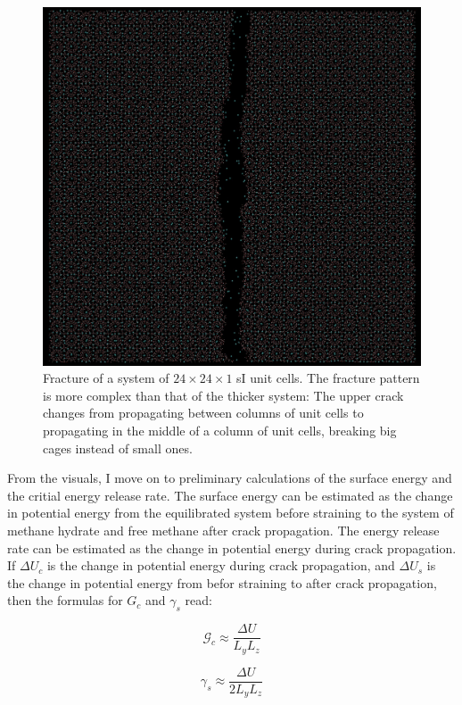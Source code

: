 \begin{figure}
\includegraphics[width=\textwidth]{../pictures/slim_system.pdf}
\caption{Fracture of a system of $24 \times 24 \times 1$ sI unit cells. The fracture pattern is more complex than that of the thicker system: The upper crack changes from propagating between columns of unit cells to propagating in the middle of a column of unit cells, breaking big cages instead of small ones.}
\label{fig:thin_crack}
\end{figure}

From the visuals, I move on to preliminary calculations of the surface energy and the critial energy release rate. The surface energy can be estimated as the change in potential energy from the equilibrated system before straining to the system of methane hydrate and free methane after crack propagation. The energy release rate can be estimated as the change in potential energy during crack propagation. If $\Delta U_c$ is the change in potential energy during crack propagation, and $\Delta U_s$ is the change in potential energy from befor straining to after crack propagation, then the formulas for $G_c$ and $\gamma_s$ read:

\begin{equation}
	\mathcal{G}_c \approx \frac{\Delta U}{L_yL_z}
\end{equation}

\begin{equation}
	\gamma_s \approx \frac{\Delta U}{2 L_y L_z}
\end{equation}

